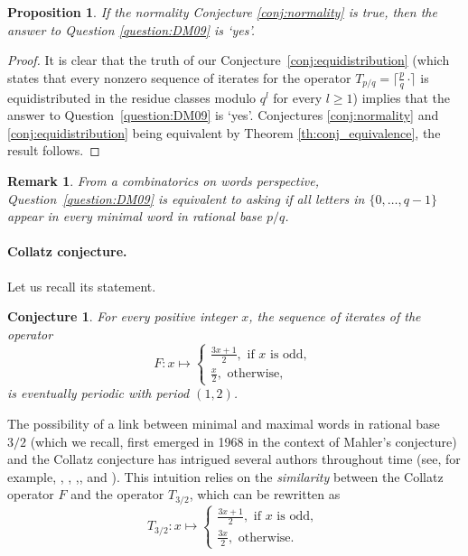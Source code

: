\documentclass{template_arxiv}
\newtheorem{conjecture}[theorem]{Conjecture}
\newtheorem{proposition}[theorem]{Proposition}
\newtheorem{remark}[theorem]{Remark}
\numberwithin{equation}{section}
\begin{document}
\begin{proposition}\label{prop:implies43problem}
	If the normality Conjecture \ref{conj:normality} is true, then the answer to Question \ref{question:DM09} is `yes'.
\end{proposition}

\begin{proof}It is clear that the truth of our Conjecture~\ref{conj:equidistribution} (which states that every nonzero sequence of iterates for the operator $T_{p/q}=\lceil \frac{p}{q} \, \bm{\cdot} \rceil$ is equidistributed in the  residue classes modulo $q^l$ for every $l\geq 1$) implies that the answer to Question~\ref{question:DM09} is `yes'. Conjectures \ref{conj:normality} and \ref{conj:equidistribution} being equivalent by Theorem \ref{th:conj_equivalence}, the result follows.
\end{proof}

\begin{remark}\label{rk:DM09_conjecture} From a combinatorics on words perspective, Question~\ref{question:DM09} is equivalent to asking if all letters in $\{0,\dots,q-1\}$ appear in every minimal word in rational base $p/q$. 
\end{remark}


\paragraph{Collatz conjecture.}

Let us recall its statement.

\begin{conjecture}\label{conj:collatz}
	For every positive integer $x$, the sequence of iterates of the operator
	\[F : x \mapsto \begin{cases}
	\frac{3x+1}{2}, \text{ if $x$ is odd, }\\
	\frac{x}{2}, \text{ otherwise,}
	\end{cases}\]
	is eventually periodic with period $(1,2)$.
\end{conjecture}


The possibility of a link between minimal and maximal words in rational base $3/2$ (which we recall, first emerged in 1968 in the context of Mahler's conjecture) and the Collatz conjecture
has intrigued several authors throughout time (see, for example, \cite{Lag85},  \cite{DM09}, \cite{Dub09},\cite{Ais14}, and \cite{EVG25}). This intuition  relies on the \emph{similarity} between the Collatz operator $F$ and the operator $T_{3/2}$, which can be rewritten as
\[T_{3/2} : x \mapsto \begin{cases}
\frac{3x+1}{2}, \text{ if $x$ is odd, }\\
\frac{3x}{2}, \text{ otherwise.}
\end{cases}\]
\end{document}
